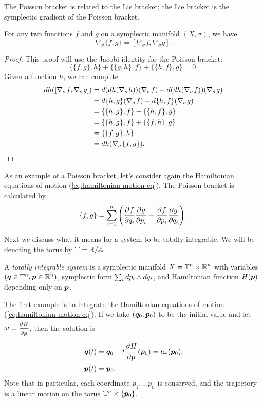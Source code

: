 \documentclass[twoside,letterpaper,10pt]{article}
\newcommand{\sgrad}{\nabla_{\sigma}}
\newcommand{\T}{\mathbb{T}}
\begin{document}
The Poisson bracket is related to the Lie bracket;
the Lie bracket is the symplectic gradient of the Poisson bracket.
\begin{prop}
  For any two functions $f$ and $g$ on a symplectic manifold $(X, \sigma)$, we
  have
  \begin{equation*}
    \sgrad \{f, g\} = [\sgrad f, \sgrad g].
  \end{equation*} 
\end{prop}
\begin{proof}
  This proof will use the Jacobi identity for the Poisson bracket:
  \begin{equation*}
    \{\{f, g\}, h\} + \{\{g, h\}, f\} + \{\{h, f\}, g\} = 0.
  \end{equation*}
  Given a function $h$, we can compute
  \begin{align*}
    \dif h([\sgrad f, \sgrad g]) &= \dif (\dif h (\sgrad h)) (\sgrad f) - \dif
                                   (\dif h (\sgrad f)) (\sgrad g)\\
                                 &= \dif \{h, g\} (\sgrad f) - \dif \{h, f\}
                       (\sgrad g)\\
                                 &= \{ \{h, g\}, f\} - \{ \{ h, f\}, g\}\\
                                 &= \{\{h, g\}, f\} + \{\{f, h\}, g\}\\
                                 &= \{\{f, g\}, h\}\\
                                 &= \dif h (\sgrad \{f, g\}).
  \end{align*}
\end{proof}
As an example of a Poisson bracket, let's consider again the Hamiltonian
equations of motion (\cref{eq:hamiltonian-motion-eq}).
The Poisson bracket is calculated by
\begin{equation*}
  \{f, g\} = \sum_{i=1}^n \left( \frac{\strut\partial^{}f}{\strut\partial q_i^{}} \frac{\strut\partial^{}g}{\strut\partial p_i^{}} - \frac{\strut\partial^{}f}{\strut\partial p_i^{}}
    \frac{\strut\partial^{}g}{\strut\partial q_i^{}} \right).
\end{equation*}

Next we discuss what it means for a system to be totally integrable.
We will be denoting the torus by $\T = \R / \Z$.
\begin{defn}
  A \emph{totally integrable system} is a symplectic manifold $X = \T^n \times
  \R^n$ with variables $(\bp{q} \in \T^n, \bp{p} \in \R^n)$, symplectic form
  $\sum_i \mathop{}\!d p_i \wedge \mathop{}\!d q_i$, and Hamiltonian function $H(\bm{p})$
  depending only on $\bm{p}$.
\end{defn}
The first example is to integrate the Hamiltonian equations of motion
(\cref{eq:hamiltonian-motion-eq}).
If we take $(\bm{q}_0, \bm{p}_0)$ to be the initial value and let $\omega =
\frac{\strut\partial^{}H}{\strut\partial\bm{p}^{}}$, then the solution is 
\begin{align*}
  \bm{q}(t) &= \bm{q}_0 + t \frac{\strut\partial^{}H}{\strut\partial\bm{p}^{}}(\bm{p}_0) = t \omega(\bm{p}_0),\\
  \bm{p}(t) &= \bm{p}_0.
\end{align*}
Note that in particular, each coordinate $p_1, \ldots p_n$ is conserved, and the
trajectory is a linear motion on the torus $\T^n \times \{\bp{p}_0\}$.
\end{document}
